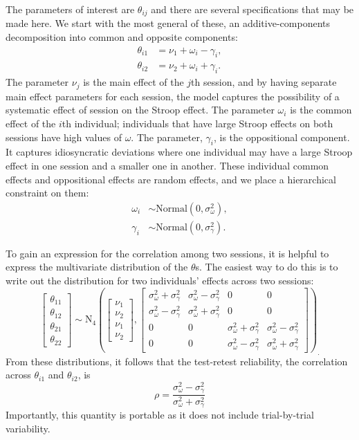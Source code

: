 \documentclass[english,man]{apa6}
\theoremstyle{definition}
\theoremstyle{definition}
\theoremstyle{definition}
\theoremstyle{remark}
\begin{document}
The parameters of interest are \(\theta_{ij}\) and there are several
specifications that may be made here. We start with the most general of
these, an additive-components decomposition into common and opposite
components: \[
\begin{aligned}
\theta_{i1} &= \nu_1 + \omega_i - \gamma_i,\\
\theta_{i2} &= \nu_2 + \omega_i + \gamma_i.
\end{aligned}
\] The parameter \(\nu_j\) is the main effect of the \(j\)th session,
and by having separate main effect parameters for each session, the
model captures the possibility of a systematic effect of session on the
Stroop effect. The parameter \(\omega_i\) is the common effect of the
\(i\)th individual; individuals that have large Stroop effects on both
sessions have high values of \(\omega\). The parameter, \(\gamma_i\), is
the oppositional component. It captures idiosyncratic deviations where
one individual may have a large Stroop effect in one session and a
smaller one in another. These individual common effects and oppositional
effects are random effects, and we place a hierarchical constraint on
them: \[
\begin{aligned}
\omega_i &\sim \mbox{Normal}(0,\sigma^2_\omega),\\
\gamma_i &\sim \mbox{Normal}(0,\sigma^2_\gamma).
\end{aligned}
\]

To gain an expression for the correlation among two sessions, it is
helpful to express the multivariate distribution of the \(\theta\)s. The
easiest way to do this is to write out the distribution for two
individuals' effects across two sessions: \[
\begin{bmatrix} \theta_{11} \\ \theta_{12} \\ \theta_{21} \\ \theta_{22} \end{bmatrix}
\sim \mbox{N}_4\left(
\begin{bmatrix} \nu_1 \\ \nu_2 \\ \nu_1 \\ \nu_2 \end{bmatrix},
\begin{bmatrix} 
\sigma^2_\omega+\sigma^2_\gamma & \sigma^2_\omega-\sigma^2_\gamma& 0 & 0\\ 
\sigma^2_\omega-\sigma^2_\gamma & \sigma^2_\omega+\sigma^2_\gamma & 0 & 0\\
0 & 0 &\sigma^2_\omega+\sigma^2_\gamma & \sigma^2_\omega-\sigma^2_\gamma \\ 
0 & 0 & \sigma^2_\omega-\sigma^2_\gamma & \sigma^2_\omega+\sigma^2_\gamma
\end{bmatrix}
\right)_.
\] From these distributions, it follows that the test-retest
reliability, the correlation across \(\theta_{i1}\) and \(\theta_{i2}\),
is \[
\rho = \frac{\sigma^2_\omega-\sigma^2_\gamma}{\sigma^2_\omega+\sigma^2_\gamma}
\] Importantly, this quantity is portable as it does not include
trial-by-trial variability.
\end{document}
